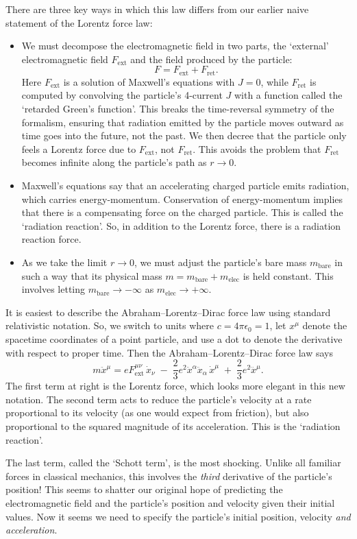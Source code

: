 \documentclass[12pt]{article}
\newcommand{\bare}{\mathrm{bare}}
\newcommand{\elec}{\mathrm{elec}}
\newcommand{\ret}{\mathrm{ret}}
\newcommand{\ext}{\mathrm{ext}}
\begin{document}
There are three key ways in which this law differs from our earlier naive statement of the Lorentz force law: 
\begin{itemize}
\item 
We must decompose the electromagnetic field in two parts, the `external' electromagnetic field $F_\ext$ and the field produced by the particle:
\[             F = F_\ext + F_\ret .  \]
Here $F_\ext$ is a solution of Maxwell's equations with $J = 0$, while $F_\ret$ is computed by convolving the particle's 4-current $J$ with a function called the `retarded Green's function'.  This breaks the time-reversal symmetry of the formalism, ensuring that radiation emitted by the particle moves outward as time goes into the future, not the past.   We then decree that the particle only feels a Lorentz force due to $F_\ext$, not $F_\ret$.  This avoids the problem that $F_\ret$ becomes infinite along the particle's path as $r \to 0$.
\item
Maxwell's equations say that an accelerating charged particle emits radiation, which carries energy-momentum.   Conservation of energy-momentum implies that there is a compensating force on the charged particle.  This is called the `radiation reaction'.  
So, in addition to the Lorentz force, there is a radiation reaction force.
\item 
As we take the limit $r \to 0$, we must adjust the particle's bare mass $m_\bare$ in 
such a way that its physical mass $m = m_\bare + m_\elec$ is held constant.   This involves letting $m_\bare \to -\infty$ as $m_\elec \to +\infty$.
\end{itemize}

It is easiest to describe the Abraham--Lorentz--Dirac force law using standard relativistic notation.  So, we switch to units where $c = 4 \pi \epsilon_0 = 1$, let $x^\mu$ denote the spacetime coordinates of a point particle, and use a dot to denote the derivative with respect to proper time.  Then the Abraham--Lorentz--Dirac force law says
\[   m \ddot{x}^\mu = e F_{\mathrm{ext}}^{\mu \nu} \,\dot{x}_\nu \; - \; 
\frac{2}{3}e^2 \ddot{x}^\alpha \ddot{x}_\alpha  \, \dot{x}^\mu \; + \; 
\frac{2}{3}e^2 \dddot{x}^\mu .\]
The first term at right is the Lorentz force, which looks more elegant in this new notation.  The second term acts to reduce the particle's velocity at a rate proportional to its velocity (as one would expect from friction), but also proportional to the squared magnitude of its acceleration.  This is the `radiation reaction'.

The last term, called the `Schott term', is the most shocking.  Unlike all familiar forces in classical mechanics, this involves the \emph{third} derivative of the particle's position!  This seems to shatter our original hope of predicting the electromagnetic field and the particle's position and velocity given their initial values.   Now it seems we need to specify the particle's initial position, velocity \emph{and acceleration}.  
\end{document}
